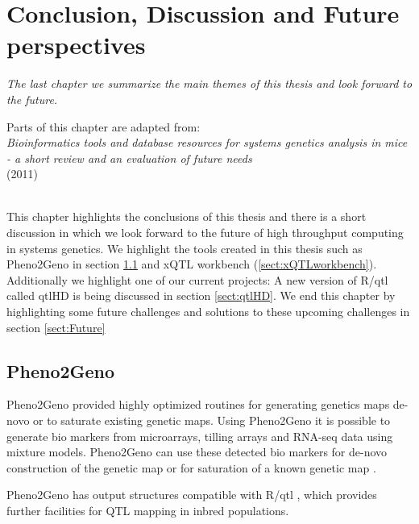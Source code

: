 \chapter{Conclusion, Discussion and Future perspectives}
\thispagestyle{empty}
\emph{The last chapter we summarize the main themes of this thesis and look forward to the future.}
\null
\vfill

\begin{myexampleblock}{Parts of this chapter are adapted from:}
  \\
  \emph{ Bioinformatics tools and database resources for systems genetics analysis in mice 
         - a short review and an evaluation of future needs}\\
   (2011)\\\\
\end{myexampleblock}

\newpage

This chapter highlights the conclusions of this thesis and there is a short discussion in 
which we look forward to the future of high throughput computing in systems genetics. We 
highlight the tools created in this thesis such as Pheno2Geno in section \ref{sect:Pheno2Geno} and xQTL 
workbench (\ref{sect:xQTLworkbench}). Additionally we highlight one of our current projects: A new 
version of R/qtl called qtlHD is being discussed in section \ref{sect:qtlHD}. We end this chapter by 
highlighting some future challenges and solutions to these upcoming challenges in section \ref{sect:Future}

\section{Pheno2Geno}
\label{sect:Pheno2Geno}
Pheno2Geno provided highly optimized routines for generating genetics maps de-novo or to 
saturate existing genetic maps. Using Pheno2Geno it is possible to generate bio markers 
from microarrays, tilling arrays and RNA-seq data using mixture models. Pheno2Geno can 
use these detected bio markers for de-novo construction of the genetic map or for 
saturation of a known genetic map \cite{West:2006, Truco:2013}.

Pheno2Geno has output structures compatible with R/qtl \cite{Broman:2003, Arends:2010}, 
which provides further facilities for QTL mapping in inbred populations.

